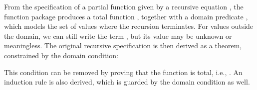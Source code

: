 \documentclass[copyright,creativecommons,sharealike]{eptcs}
\theoremstyle{remark}
\begin{document}
\begin{isabellebody}
\begin{isamarkuptext}
  From the specification of a partial function given by a recursive
  equation , the function package produces a
  total function , together with a domain
  predicate , which models the set of values
   where the recursion
  terminates. For values outside the domain, we can still write
  the term , but its value may be unknown or meaningless.
  The original recursive specification is then derived as a theorem,
  constrained by the domain condition:
  \begin{quote}\end{quote} 
  This condition can be removed by proving
  that the function is total, i.e., .  An
  induction rule is also derived, which is guarded by the domain
  condition as well.


\end{isamarkuptext}
\end{isabellebody}
\end{document}
